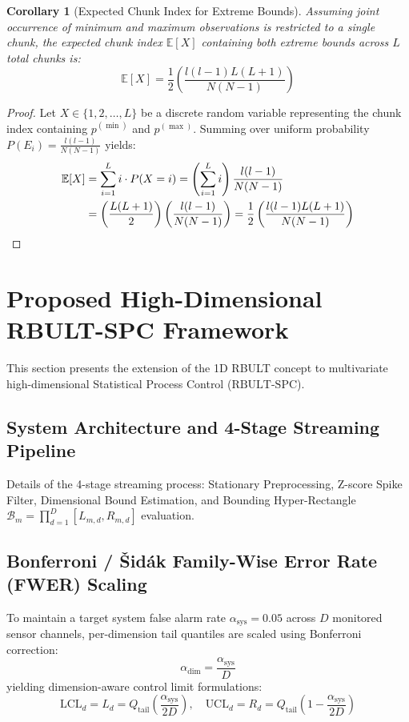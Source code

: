 \documentclass[a4paper,fleqn]{cas-sc}
\newtheorem{corollary}{Corollary}
\begin{document}
\begin{corollary}[Expected Chunk Index for Extreme Bounds]
Assuming joint occurrence of minimum and maximum observations is restricted to a single chunk, the expected chunk index $\mathbb{E}[X]$ containing both extreme bounds across $L$ total chunks is:
\begin{equation}
\mathbb{E}[X] = \frac{1}{2} \left( \frac{l(l-1) L (L+1)}{N(N-1)} \right)
\end{equation}
\end{corollary}
\begin{proof}
Let $X \in \{1, 2, \dots, L\}$ be a discrete random variable representing the chunk index containing $p^{(\min)}$ and $p^{(\max)}$. Summing over uniform probability $P(E_i) = \frac{l(l-1)}{N(N-1)}$ yields:
\begin{align}
\mathbb{E}[X] &= \sum_{i=1}^{L} i \cdot P(X = i) = \left( \sum_{i=1}^{L} i \right) \frac{l(l-1)}{N(N-1)} \notag \\
&= \left( \frac{L(L+1)}{2} \right) \left( \frac{l(l-1)}{N(N-1)} \right) = \frac{1}{2} \left( \frac{l(l-1) L (L+1)}{N(N-1)} \right)
\end{align}
\end{proof}


\section{Proposed High-Dimensional RBULT-SPC Framework}\label{sec4_framework}
This section presents the extension of the 1D RBULT concept to multivariate high-dimensional Statistical Process Control ($\text{RBULT-SPC}$).

\subsection{System Architecture and 4-Stage Streaming Pipeline}
Details of the 4-stage streaming process: Stationary Preprocessing, Z-score Spike Filter, Dimensional Bound Estimation, and Bounding Hyper-Rectangle $\mathcal{B}_m = \prod_{d=1}^D [L_{m,d}, R_{m,d}]$ evaluation.

\subsection{Bonferroni / Šidák Family-Wise Error Rate (FWER) Scaling}
To maintain a target system false alarm rate $\alpha_{\text{sys}} = 0.05$ across $D$ monitored sensor channels, per-dimension tail quantiles are scaled using Bonferroni correction:
\begin{equation}
\alpha_{\text{dim}} = \frac{\alpha_{\text{sys}}}{D}
\end{equation}
yielding dimension-aware control limit formulations:
\begin{equation}
\text{LCL}_d = L_d = Q_{\text{tail}}\left(\frac{\alpha_{\text{sys}}}{2D}\right), \quad \text{UCL}_d = R_d = Q_{\text{tail}}\left(1 - \frac{\alpha_{\text{sys}}}{2D}\right)
\end{equation}
\end{document}
